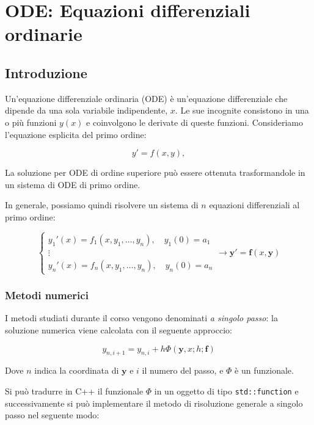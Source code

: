 \setchapterpreamble[u]{\margintoc}
\chapter{ODE: Equazioni differenziali ordinarie}

\section{Introduzione}

Un'equazione differenziale ordinaria (ODE) è un'equazione differenziale che
dipende da una sola variabile indipendente, \(x\). Le sue incognite consistono
in una o più funzioni \(y(x)\) e coinvolgono le derivate di queste funzioni.
Consideriamo l'equazione esplicita del primo ordine:

\[
	y' = f(x, y),
\]

La soluzione per ODE di ordine superiore può essere ottenuta trasformandole in
un sistema di ODE di primo ordine.

In generale, possiamo quindi risolvere un sistema di $n$ equazioni differenziali
al primo ordine:

\[
	\begin{cases}
		y_1'(x) = f_1(x, y_1, \dots, y_n), \quad y_1(0) = a_1 \\
		\vdots                                                \\
		y_n'(x) = f_n(x, y_1, \dots, y_n), \quad y_n(0) = a_n
	\end{cases}
	\rightarrow \mathbf{y}' = \mathbf{f}(x, \mathbf{y})
\]

\subsection{Metodi numerici}

I metodi studiati durante il corso vengono denominati \textit{a singolo passo}:
la soluzione numerica viene calcolata con il seguente approccio:

$$
	y_{n, i+1} = y_{n, i} + h \Phi(\mathbf{y}, x; h; \mathbf{f})
$$

Dove $n$ indica la coordinata di $\mathbf{y}$ e $i$ il numero del passo, e $\Phi$
è un funzionale.

Si può tradurre in C++ il funzionale $\Phi$ in un oggetto di tipo
\texttt{std::function} e successivamente si può implementare il metodo di
risoluzione generale a singolo passo nel seguente modo:

